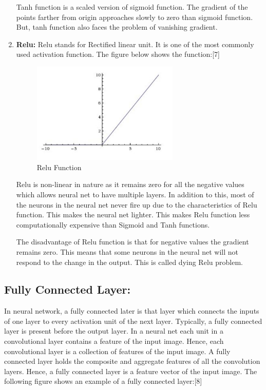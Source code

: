 \documentclass{IEEEtran}
\begin{document}
\begin{enumerate}
Tanh function is a scaled version of sigmoid function. The gradient of the points farther from origin approaches slowly to zero than sigmoid function. But, tanh function also faces the problem of vanishing gradient.

\item \textbf{Relu:} Relu stands for Rectified linear unit. It is one of the most commonly used activation function. The figure below shows the function:[7]
\newpage

\begin{figure}[h]
    \centering
    \captionsetup{justification=centering}
    \includegraphics[width=7cm]{relu}
    \caption{Relu Function}
    \label{fig: Relu Function}
\end{figure}

Relu is non-linear in nature as it remains zero for all the negative values which allows neural net to have multiple layers. In addition to this, most of the neurons in the neural net never fire up due to the characteristics of Relu function. This makes the neural net lighter. This makes Relu function less computationally expensive than Sigmoid and Tanh functions.

The disadvantage of Relu function is that for negative values the gradient remains zero. This means that some neurons in the neural net will not respond to the change in the output. This is called dying Relu problem.
\end{enumerate} 

\subsection{\textbf{Fully Connected Layer:}}
In neural network, a fully connected later is that layer which connects the inputs of one layer to every activation unit of the next layer. Typically, a fully connected layer is present before the output layer. In a neural net each unit in a convolutional layer contains a feature of the input image. Hence, each convolutional layer is a collection of features of the input image. A fully connected layer holds the composite and aggregate features of all the convolution layers. Hence, a fully connected layer is a feature vector of the input image. The following figure shows an example of a fully connected layer:[8]
\end{document}
